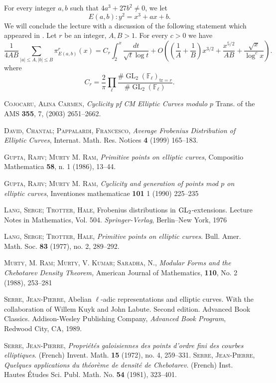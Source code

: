 \documentclass[a4paper,10pt]{article}
\newcommand{\F}{\mathbb{F}}
\begin{document}
For every integer $a,b$ such that $4a^3+27b^2\ne0$, we let
$$E(a,b):y^2=x^3+ax+b.$$
We will conclude the lecture with a discussion of the following statement which appeared in \cite{DP}.
 Let $r$ be an integer, $A,B>1$. For every $c > 0$ we have
$$\frac{1}{4AB}\sum_{|a|\le A,|b|\le B}
\pi^r_{E(a,b)}(x)=C_r\int_2^x\frac{dt}{\sqrt{t}\log t}+
O\left(\left(\frac1A+\frac1B\right)x^{3/2}+\frac{x^{5/2}}{AB}+\frac{\sqrt x}{\log^cx}
\right).$$
where
$$C_r=\frac2\pi\prod_{\ell}\frac{\#\operatorname{GL}_2(\F_\ell)_{\text{tr}=r}}{\#\operatorname{GL}_2(\F_\ell)}.$$

\begin{thebibliography}{2}
\textsc{Cojocaru, Alina Carmen}, 
\textit{Cyclicity pf CM Elliptic Curves modulo $p$}
Trans. of the AMS \textbf{355}, 7, (2003) 2651--2662.

\textsc{David, Chantal; Pappalardi, Francesco},
\textit{Average Frobenius Distribution of Elliptic Curves}, 
Internat. Math. Res. Notices \textbf{4} (1999) 165--183.

\textsc{Gupta, Rajiv; Murty M. Ram},
\textit{Primitive points on elliptic curves},
Compositio Mathematica \textbf{58}, n. 1 (1986), 13--44.

\textsc{Gupta, Rajiv; Murty M. Ram},
\textit{Cyclicity and generation of points mod $p$ on elliptic curves},
Inventiones mathematicae \textbf{101} 1 (1990)  225--235

\textsc{Lang, Serge; Trotter, Hale},
Frobenius distributions in ${\rm GL}_{2}$-extensions.
Lecture Notes in Mathematics, Vol. 504. \textit{Springer-Verlag}, Berlin--New York, 1976

\textsc{Lang, Serge; Trotter, Hale},
\textit{Primitive points on elliptic curves}. Bull. Amer. Math. Soc. 
\textbf{83} (1977), no. 2, 289--292.

\textsc{Murty, M. Ram; Murty, V. Kumar; Saradha, N.},
\textit{Modular Forms and the Chebotarev Density Theorem,}
American Journal of Mathematics, \textbf{110}, No. 2 (1988), 253--281

\textsc{Serre, Jean-Pierre}, 
Abelian $\ell$-adic representations and elliptic curves. 
With the collaboration of Willem Kuyk and John Labute. 
Second edition. Advanced Book Classics. Addison-Wesley Publishing Company, 
\textit{Advanced Book Program}, Redwood City, CA, 1989.

\textsc{Serre, Jean-Pierre},
\textit{Propri\'et\'es galoisiennes des points d'ordre fini des courbes elliptiques}. 
(French) Invent. Math. \textbf{15} (1972), no. 4, 259--331.
\rho
{}
\textsc{Serre, Jean-Pierre},
\textit{Quelques applications du th\'eor\`eme de densit\'e de Chebotarev}. (French) 
Inst. Hautes \'Etudes Sci. Publ. Math. No. \textbf{54} (1981), 323--401. 
\end{thebibliography} 
\end{document}
